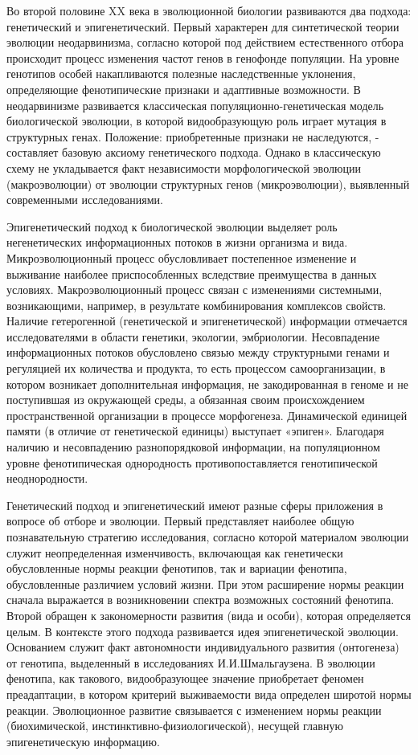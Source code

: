 \documentclass[exam_answers.tex]{subfiles}
\begin{document}
Во второй половине XX века в эволюционной биологии развиваются два
подхода: генетический и эпигенетический. Первый характерен для
синтетической теории эволюции неодарвинизма, согласно которой под
действием естественного отбора происходит процесс изменения частот генов в
генофонде популяции. На уровне генотипов особей накапливаются полезные
наследственные уклонения, определяющие фенотипические признаки и
адаптивные возможности. В неодарвинизме развивается классическая
популяционно-генетическая модель биологической эволюции, в которой
видообразующую роль играет мутация в структурных генах. Положение:
приобретенные признаки не наследуются, - составляет базовую аксиому
генетического подхода. Однако в классическую схему не укладывается факт
независимости морфологической эволюции (макроэволюции) от эволюции
структурных генов (микроэволюции), выявленный современными
исследованиями.

Эпигенетический подход к биологической эволюции выделяет роль
негенетических информационных потоков в жизни организма и вида.
Микроэволюционный процесс обусловливает постепенное изменение и
выживание наиболее приспособленных вследствие преимущества в данных
условиях. Макроэволюционный процесс связан с изменениями системными,
возникающими, например, в результате комбинирования комплексов свойств.
Наличие гетерогенной (генетической и эпигенетической) информации
отмечается исследователями в области генетики, экологии, эмбриологии.
Несовпадение информационных потоков обусловлено связью между
структурными генами и регуляцией их количества и продукта, то есть
процессом самоорганизации, в котором возникает дополнительная информация,
не закодированная в геноме и не поступившая из окружающей среды, а
обязанная своим происхождением пространственной организации в процессе
морфогенеза. Динамической единицей памяти (в отличие от генетической
единицы) выступает «эпиген». Благодаря наличию и несовпадению 
разнопорядковой информации, на популяционном уровне фенотипическая
однородность противопоставляется генотипической неоднородности.

Генетический подход и эпигенетический имеют разные сферы приложения
в вопросе об отборе и эволюции. Первый представляет наиболее общую
познавательную стратегию исследования, согласно которой материалом
эволюции служит неопределенная изменчивость, включающая как генетически
обусловленные нормы реакции фенотипов, так и вариации фенотипа,
обусловленные различием условий жизни. При этом расширение нормы
реакции сначала выражается в возникновении спектра возможных состояний
фенотипа. Второй обращен к закономерности развития (вида и особи), которая
определяется целым. В контексте этого подхода развивается идея
эпигенетической эволюции. Основанием служит факт автономности
индивидуального развития (онтогенеза) от генотипа, выделенный в
исследованиях И.И.Шмальгаузена. В эволюции фенотипа, как такового,
видообразующее значение приобретает феномен преадаптации, в котором
критерий выживаемости вида определен широтой нормы реакции.
Эволюционное развитие связывается с изменением нормы реакции
(биохимической, инстинктивно-физиологической), несущей главную
эпигенетическую информацию.
\end{document}

